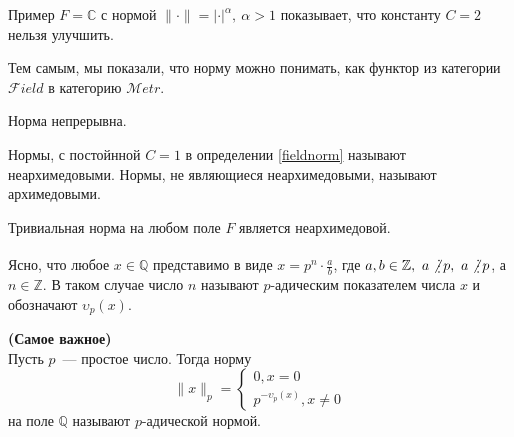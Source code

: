 \documentclass[11pt]{article}
\begin{document}
    \begin{remark}
        Пример $F = \mathbb{C}$ с нормой $\| \cdot \| = | \cdot |^{\alpha}, \ \alpha > 1$ показывает, что константу $C = 2$ нельзя улучшить.
    \end{remark}
    \begin{remark}
        Тем самым, мы показали, что норму можно понимать, как функтор из категории $\mathcal{F}ield$ в категорию $\mathcal{M}etr$.
    \end{remark}
    \begin{corollary}
        Норма непрерывна.
    \end{corollary}
    \begin{definition}
        Нормы, с постойнной $C = 1$ в определении \ref{fieldnorm} называют неархимедовыми. Нормы, не являющиеся неархимедовыми,
        называют архимедовыми.
    \end{definition}
    \begin{example}
        Тривиальная норма на любом поле $F$ является неархимедовой.
    \end{example}
    \begin{definition}
        Ясно, что любое $x \in \mathbb{Q}$ представимо в виде $x = p^n \cdot \frac{a}{b}$, где $a, b \in \mathbb{Z}, \ a \not\divisible p, \ a \not\divisible p$, а $n \in \mathbb{Z}$.
        В таком случае число $n$ называют $p$-адическим показателем числа $x$ и обозначают $\upsilon_p(x)$.
    \end{definition}
    \begin{definition} \textbf{(Самое важное)}\\
    Пусть $p$~--- простое число. Тогда норму
        \[ \| x \|_{p} = \begin{cases} 0, x = 0 \\ p^{-\upsilon_p(x)}, x \neq 0  \end{cases}\]
    на поле $\mathbb{Q}$ называют $p$-адической нормой.
    \end{definition}
\end{document}
